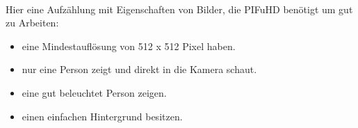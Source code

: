 \\
Hier eine Aufzählung mit Eigenschaften von Bilder, die PIFuHD benötigt um gut zu Arbeiten:
\\

\begin{itemize}
	\item eine Mindestauflösung von 512 x 512 Pixel haben.
	\item nur eine Person zeigt und direkt in die Kamera schaut.
	\item eine gut beleuchtet Person zeigen.
	\item einen einfachen Hintergrund besitzen.
\end{itemize}

